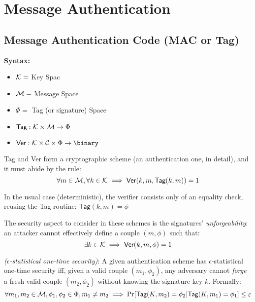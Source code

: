 
\section{Message Authentication}


\subsection{Message Authentication Code (MAC or Tag)}

\textbf{Syntax:}

\begin{itemize}
    \item $\mathcal{K} = $ Key Spac 
    \item $\mathcal{M} = $ Message Space
    \item $\Phi = $ Tag (or signature) Space
    \item $\textsf{Tag}: \mathcal{K} \times \mathcal{M} \to \Phi$
    \item $\textsf{Ver}: \K \times \C \times \Phi \to \binary$
\end{itemize}

\textsf{Tag} and \textsf{Ver} form a cryptographic scheme (an authentication one, in detail), and it must abide by the rule:
\[
    \forall m \in \mathcal{M}, \forall k \in \mathcal{K} \implies \textsf{Ver}(k, m, \textsf{Tag}(k, m)) = 1
\]

In the usual case (deterministic), the verifier consists only of an equality check, reusing the \textsf{Tag} routine: $\textsf{Tag}(k, m) = \phi$

The security aspect to consider in these schemes is the signatures' \emph{unforgeability}: an attacker cannot effectively define a couple $(m, \phi)$ such that:
\[
    \exists k \in \mathcal{K} \implies \textsf{Ver}(k, m, \phi) = 1
\]

\begin{definition} \emph{($\epsilon$-statistical one-time security)}: A given authentication scheme has $\epsilon$-statistical one-time security iff, given a valid couple $(m_1, \phi_2)$, any adversary cannot \emph{forge} a fresh valid couple $(m_2, \phi_2)$ without knowing the signature key $k$. Formally:
    \[
        \forall m_1, m_2 \in \mathcal{M}, \phi_1, \phi_2 \in \Phi, m_1 \neq m_2 \implies \Pr[\textsf{Tag}(K, m_2) = \phi_2|\textsf{Tag}(K, m_1) = \phi_1] \leq \varepsilon
    \]
    
\end{definition}

